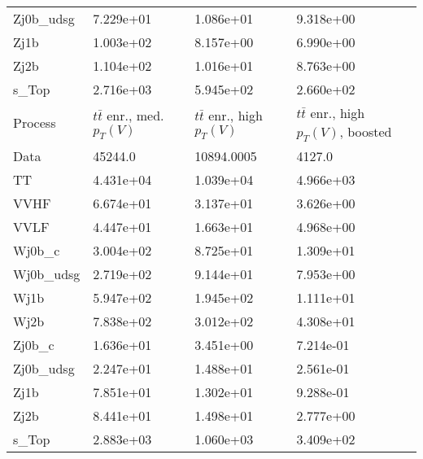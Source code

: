 \begin{table}
{\begin{tabularx}{0.8\textwidth}{|X|X|X|X|}
Zj0b\_udsg & 7.229e+01 & 1.086e+01 & 9.318e+00 \\
Zj1b & 1.003e+02 & 8.157e+00 & 6.990e+00 \\
Zj2b & 1.104e+02 & 1.016e+01 & 8.763e+00 \\
s\_Top & 2.716e+03 & 5.945e+02 & 2.660e+02 \\
\hline
\hline
Process & $t\bar{t}$ enr., med. $p_{T}(V)$ & $t\bar{t}$ enr., high $p_{T}(V)$ & $t\bar{t}$ enr., high $p_{T}(V)$, boosted \\
\hline
Data & 45244.0 & 10894.0005 & 4127.0 \\
\hline
TT & 4.431e+04 & 1.039e+04 & 4.966e+03 \\
VVHF & 6.674e+01 & 3.137e+01 & 3.626e+00 \\
VVLF & 4.447e+01 & 1.663e+01 & 4.968e+00 \\
Wj0b\_c & 3.004e+02 & 8.725e+01 & 1.309e+01 \\
Wj0b\_udsg & 2.719e+02 & 9.144e+01 & 7.953e+00 \\
Wj1b & 5.947e+02 & 1.945e+02 & 1.111e+01 \\
Wj2b & 7.838e+02 & 3.012e+02 & 4.308e+01 \\
Zj0b\_c & 1.636e+01 & 3.451e+00 & 7.214e-01 \\
Zj0b\_udsg & 2.247e+01 & 1.488e+01 & 2.561e-01 \\
Zj1b & 7.851e+01 & 1.302e+01 & 9.288e-01 \\
Zj2b & 8.441e+01 & 1.498e+01 & 2.777e+00 \\
s\_Top & 2.883e+03 & 1.060e+03 & 3.409e+02 \\
\hline
\end{tabularx}
}
\label{tab:cr-Wen-2017}
\end{table}

